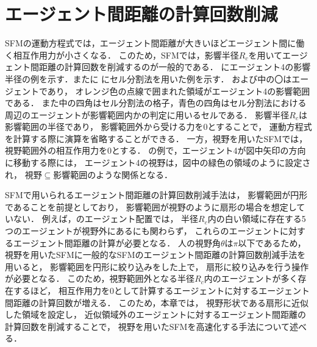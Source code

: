 \chapter{エージェント間距離の計算回数削減}
\label{sec:reduce_distance}
SFMの運動方程式では，エージェント間距離が大きいほどエージェント間に働く相互作用力が小さくなる．
このため，SFMでは，影響半径$R_{c}$を用いてエージェント間距離の計算回数を削減するのが一般的である．
にエージェント4の影響半径の例を示す．またに
にセル分割法を用いた例を示す．
%
%
%
および中の〇はエージェントであり，
オレンジ色の点線で囲まれた領域がエージェント4の影響範囲である．
また中の四角はセル分割法の格子，青色の四角はセル分割法における
周辺のエージェントが影響範囲内かの判定に用いるセルである．
影響半径$R_{c}$は影響範囲の半径であり，
影響範囲外から受ける力を0とすることで，
運動方程式を計算する際に演算を省略することができる．
一方，視野を用いたSFMでは，視野範囲外の相互作用力を0とする．
の例で，エージェント4が図中矢印の方向に移動する際には，
エージェント4の視野は，図中の緑色の領域のように設定され，
視野$\subseteq$影響範囲のような関係となる．

SFMで用いられるエージェント間距離の計算回数削減手法は，
影響範囲が円形であることを前提としており，
影響範囲が視野のように扇形の場合を想定していない．
例えば，のエージェント配置では，
半径$R_{c}$内の白い領域に存在する5つのエージェントが視野外にあるにも関わらず，
これらのエージェントに対するエージェント間距離の計算が必要となる．
人の視野角$\theta$は$\pi$以下であるため，
視野を用いたSFMに一般的なSFMのエージェント間距離の計算回数削減手法を用いると，
影響範囲を円形に絞り込みをした上で，%
扇形に絞り込みを行う操作が必要となる．
このため，視野範囲外となる半径$R_{c}$内のエージェントが多く存在するほど，
相互作用力を0として計算するエージェントに対するエージェント間距離の計算回数が増える．
このため，本章では，
視野形状である扇形に近似した領域を設定し，
近似領域外のエージェントに対するエージェント間距離の計算回数を削減することで，
視野を用いたSFMを高速化する手法について述べる．

